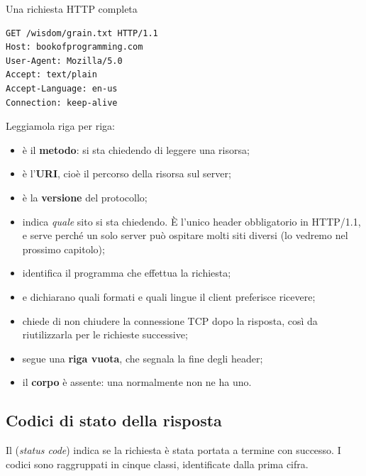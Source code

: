 \begin{esempio}{Una richiesta HTTP completa}
\begin{lstlisting}[style=http, name=Richiesta HTTP]
GET /wisdom/grain.txt HTTP/1.1
Host: bookofprogramming.com
User-Agent: Mozilla/5.0
Accept: text/plain
Accept-Language: en-us
Connection: keep-alive
\end{lstlisting}

Leggiamola riga per riga:

\begin{itemize}
  \item {} è il \textbf{metodo}: si sta chiedendo di leggere una risorsa;
  \item {} è l'\textbf{URI}, cioè il percorso della risorsa
        sul server;
  \item {} è la \textbf{versione} del protocollo;
  \item {} indica \textit{quale} sito si sta chiedendo. È l'unico header
        obbligatorio in HTTP/1.1, e serve perché un solo server può ospitare
        molti siti diversi (lo vedremo nel prossimo capitolo);
  \item {} identifica il programma che effettua la richiesta;
  \item {} e  dichiarano quali formati e quali
        lingue il client preferisce ricevere;
  \item {} chiede di non chiudere la connessione TCP
        dopo la risposta, così da riutilizzarla per le richieste successive;
  \item segue una \textbf{riga vuota}, che segnala la fine degli header;
  \item il \textbf{corpo} è assente: una  normalmente non ne ha uno.
\end{itemize}
\end{esempio}

\subsection{Codici di stato della risposta}

Il  (\textit{status code}) indica se la richiesta è stata
portata a termine con successo. I codici sono raggruppati in cinque classi,
identificate dalla prima cifra.


